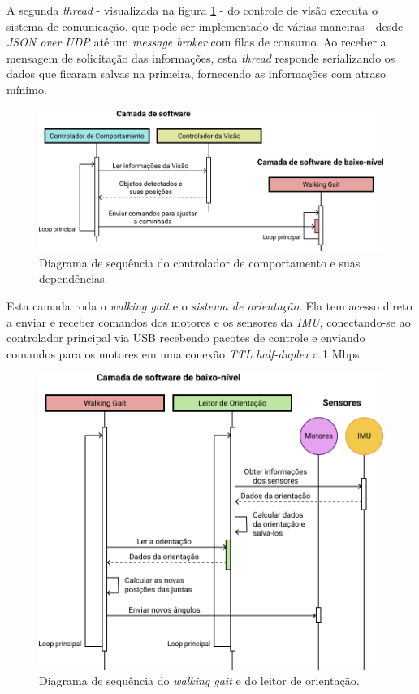 A segunda \textit{thread} - visualizada na figura \ref{fig:SoftwareArchitecture:Software} - do controle de visão executa o sistema de comunicação, que pode ser implementado de várias maneiras - desde \textit{JSON over UDP} até um \textit{message broker} com filas de consumo. Ao receber a mensagem de solicitação das informações, esta \textit{thread} responde serializando os dados que ficaram salvas na primeira, fornecendo as informações com atraso mínimo.

\begin{figure}[h!]
	\centering
	\includegraphics[scale=1]{imagens/svg/softwarearchitecture-software}
	\caption{Diagrama de sequência do controlador de comportamento e suas dependências.}
	\label{fig:SoftwareArchitecture:Software}
\end{figure}

\begin{draft}
	Esta camada roda o \textit{walking gait} e o \textit{sistema de orientação}. Ela tem acesso direto a enviar e receber comandos dos motores e os sensores da \textit{IMU}, conectando-se ao controlador principal via USB recebendo pacotes de controle e enviando comandos para os motores em uma conexão \textit{TTL} \textit{half-duplex} a 1 Mbps.
\end{draft}

\begin{figure}[h!]
	\centering
	\includegraphics[scale=1]{imagens/svg/softwarearchitecture-lowlevel}
	\caption{Diagrama de sequência do \textit{walking gait} e do leitor de orientação.}
	\label{fig:SoftwareArchitecture:LowLevel}
\end{figure}

